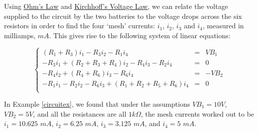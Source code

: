 \documentclass{ximera}
\begin{document}
\begin{image}
\end{image}



Using \href{http://en.wikipedia.org/wiki/Ohm's_law}{\underline{Ohm's Law}}   and \href{http://en.wikipedia.org/wiki/Kirchhoff's_circuit_laws}{\underline{Kirchhoff's Voltage Law}}, we can relate the voltage supplied to the circuit by the two batteries to the voltage drops across the six resistors in order to find the four `mesh' currents: $i_1$, $i_2$, $i_3$ and $i_4$, measured in milliamps, $mA$. This gives rise to the following system of linear equations:

\[ \left\{ \begin{array}{rcl} \left(R_1 + R_3\right)i_1 - R_3i_2 - R_1i_4 & = & V\!B_1 \\
-R_3i_1 + \left(R_2 + R_3 + R_4\right)i_2 - R_4i_3 - R_2i_4 & = & 0 \\
-R_4i_2 + \left(R_4 + R_6\right)i_3 - R_6i_4 & = & -V\!B_2 \\
-R_1i_1 - R_2i_2 - R_6i_3 + \left(R_1 + R_2 + R_5 + R_6\right)i_4 & = & 0 \\  \end{array} \right.\]

In Example \ref{circuitex}, we found that under the assumptions $V\!B_1 = 10 V$, $V\!B_2 = 5 V$, and all  the resistances are all $1 k\Omega$, the mesh currents worked out to be $i_1 = 10.625 \, \, mA$, $i_2 = 6.25 \, \, mA$, $i_3 = 3.125 \, \, mA$, and $i_4 = 5 \, \, mA$. 
\end{document}
